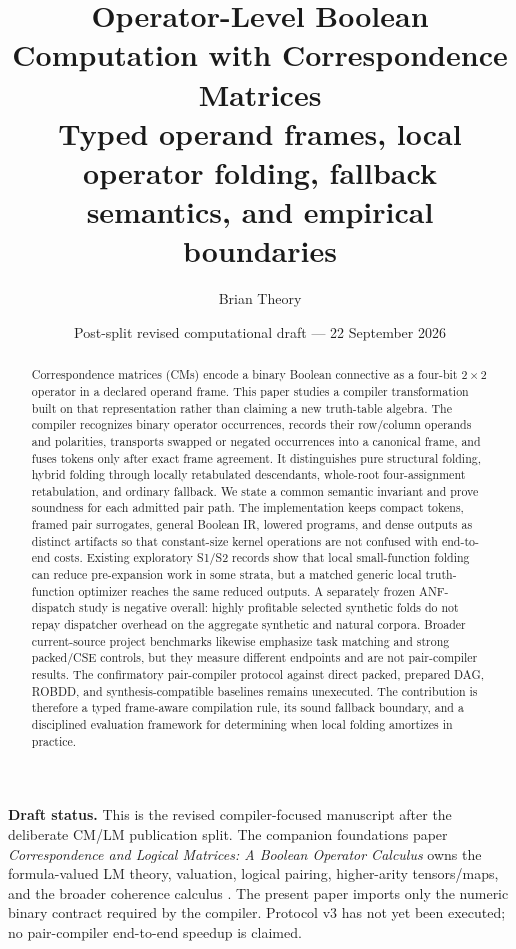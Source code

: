 \documentclass[10pt]{article}
\title{\vspace{-1.3em}\textbf{Operator-Level Boolean Computation with Correspondence Matrices}\\[0.35em]
\large Typed operand frames, local operator folding, fallback semantics, and empirical boundaries}
\author{Brian Theory}
\date{Post-split revised computational draft --- 22 September 2026}
\theoremstyle{plain}
\theoremstyle{definition}
\theoremstyle{remark}
\begin{document}
\maketitle

\begin{abstract}
Correspondence matrices (CMs) encode a binary Boolean connective as a four-bit $2\times2$ operator in a declared operand frame. This paper studies a compiler transformation built on that representation rather than claiming a new truth-table algebra. The compiler recognizes binary operator occurrences, records their row/column operands and polarities, transports swapped or negated occurrences into a canonical frame, and fuses tokens only after exact frame agreement. It distinguishes pure structural folding, hybrid folding through locally retabulated descendants, whole-root four-assignment retabulation, and ordinary fallback. We state a common semantic invariant and prove soundness for each admitted pair path. The implementation keeps compact tokens, framed pair surrogates, general Boolean IR, lowered programs, and dense outputs as distinct artifacts so that constant-size kernel operations are not confused with end-to-end costs. Existing exploratory S1/S2 records show that local small-function folding can reduce pre-expansion work in some strata, but a matched generic local truth-function optimizer reaches the same reduced outputs. A separately frozen ANF-dispatch study is negative overall: highly profitable selected synthetic folds do not repay dispatcher overhead on the aggregate synthetic and natural corpora. Broader current-source project benchmarks likewise emphasize task matching and strong packed/CSE controls, but they measure different endpoints and are not pair-compiler results. The confirmatory pair-compiler protocol against direct packed, prepared DAG, ROBDD, and synthesis-compatible baselines remains unexecuted. The contribution is therefore a typed frame-aware compilation rule, its sound fallback boundary, and a disciplined evaluation framework for determining when local folding amortizes in practice.
\end{abstract}

\noindent\textbf{Draft status.} This is the revised compiler-focused manuscript after the deliberate CM/LM publication split. The companion foundations paper \emph{Correspondence and Logical Matrices: A Boolean Operator Calculus} owns the formula-valued LM theory, valuation, logical pairing, higher-arity tensors/maps, and the broader coherence calculus \cite{TheoryFoundations2026}. The present paper imports only the numeric binary contract required by the compiler. Protocol v3 has not yet been executed; no pair-compiler end-to-end speedup is claimed.
\end{document}
